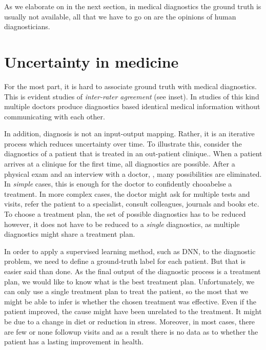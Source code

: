 \documentclass[11pt]{pnas-new}
\begin{document}
As we elaborate on in the next section, in medical diagnostics the
ground truth is usually not available, all that we have to go on are
the opinions of human diagnosticians.

\section{Uncertainty in medicine}

For the most part, it is hard to associate ground truth with medical
diagnostics. This is evident studies of {\em inter-rater agreement} (see
inset). In studies of this kind multiple doctors produce diagnostics
based identical medical information without communicating with each other. 


In addition, diagnosis is not an input-output mapping. Rather, it
is an iterative process which reduces uncertainty over time. To
illustrate this, consider the diagnostics of a patient that is treated
in an out-patient clinique..  When a patient arrives at a clinique for
the first time, all diagnostics are possible. After a physical exam
and an interview with a doctor, , many possibilities are
eliminated. In {\em simple} cases, this is enough for the doctor to
confidently chooabelse a treatment. In more complex cases, the doctor
might ask for multiple tests and visits, refer the patient to a
specialist, consult colleagues, journals and books etc. To choose a
treatment plan, the set of possible diagnostics has to be reduced
however, it does not have to be reduced to a {\em single} diagnostics,
as multiple diagnostics might share a treatment plan.

In order to apply a supervised learning method, such as  DNN, to the
diagnostic problem, we need to define a ground-truth label for each
patient. But that is easier said than done. As the final output of the
diagnostic process is a treatment plan, we would like to know what is
the best treatment plan. Unfortunately, we can only use a single
treatment plan to treat the patient, so the most that we might be able
to infer is whether the chosen treatment was effective.  Even if the
patient improved, the cause might have been unrelated to the
treatment. It might be due to a change in diet or reduction in stress.
Moreover, in most cases, there are few or none followup visits and as
a result there is no data as to whether the patient has a lasting
improvement in health.
\end{document}
